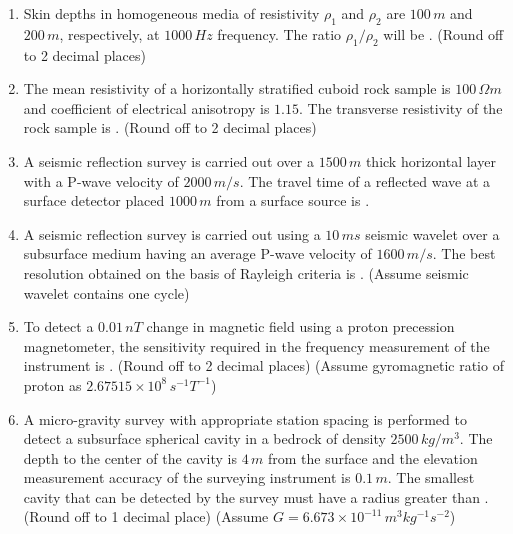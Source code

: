\documentclass[journal,12pt,onecolumn]{IEEEtran}
\begin{document}
\begin{enumerate}
\item Skin depths in homogeneous media of resistivity $\rho_1$ and $\rho_2$ are $100 \, m$ and $200 \, m$, respectively, at $1000 \, Hz$ frequency. The ratio $\rho_1/\rho_2$ will be \brak{\text{}}. (Round off to 2 decimal places)

\hfill{}


\item The mean resistivity of a horizontally stratified cuboid rock sample is $100 \, \Omega m$ and coefficient of electrical anisotropy is $1.15$. The transverse resistivity of the rock sample is . (Round off to 2 decimal places)

\hfill{}


\item A seismic reflection survey is carried out over a $1500 \, m$ thick horizontal layer with a P-wave velocity of $2000 \, m/s$. The travel time of a reflected wave at a surface detector placed $1000 \, m$ from a surface source is .

\hfill{}


\item A seismic reflection survey is carried out using a $10 \, ms$ seismic wavelet over a subsurface medium having an average P-wave velocity of $1600 \, m/s$. The best resolution obtained on the basis of Rayleigh criteria is . (Assume seismic wavelet contains one cycle)

\hfill{}


\item To detect a $0.01 \, nT$ change in magnetic field using a proton precession magnetometer, the sensitivity required in the frequency measurement of the instrument is . (Round off to 2 decimal places) (Assume gyromagnetic ratio of proton as $2.67515 \times 10^8 \, s^{-1}T^{-1}$)

\hfill{}


\item A micro-gravity survey with appropriate station spacing is performed to detect a subsurface spherical cavity in a bedrock of density $2500 \, kg/m^3$. The depth to the center of the cavity is $4 \, m$ from the surface and the elevation measurement accuracy of the surveying instrument is $0.1 \, m$. The smallest cavity that can be detected by the survey must have a radius greater than . (Round off to 1 decimal place) (Assume $G = 6.673 \times 10^{-11} \, m^3kg^{-1}s^{-2}$)


\end{enumerate}
\end{document}
